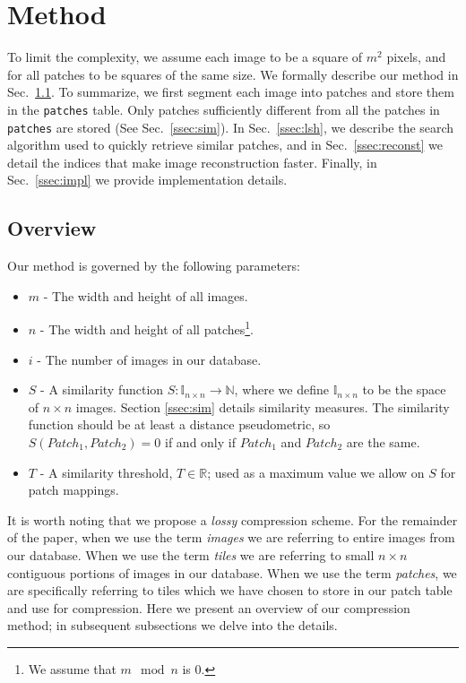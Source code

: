 \section{Method}\label{sec:method}

To limit the complexity, we assume
each image to be a square of $m^2$ pixels, and for all patches to
be squares of the same size.
We formally describe our method in Sec.~\ref{ssec:overview}. To summarize,
we first segment each image into patches and store them in the \texttt{patches} table.
Only patches sufficiently different
from all the patches in \texttt{patches} are stored (See Sec.~\ref{ssec:sim}).
In 
Sec.~\ref{ssec:lsh}, we describe the
search algorithm used to quickly retrieve similar patches, and in Sec.~\ref{ssec:reconst}
we detail the indices that make image reconstruction faster. Finally, in
Sec.~\ref{ssec:impl} we provide implementation details.

\subsection{Overview}\label{ssec:overview}

Our method is governed by the following parameters:
\begin{itemize}
\item $m$ - The width and height of all images.
\item $n$ - The width and height of all patches\footnote{We assume that $m \mod n$ is $0$.}.
\item $i$ - The number of images in our database.
\item $S$ - A similarity function $S \colon \mathds{I}_{n \times n}  \to \mathds{N}$, where we define $\mathds{I}_{n \times n}$ to be the space of $n \times n$ images.  Section \ref{ssec:sim} details similarity measures.  The similarity function should be at least a distance pseudometric, so $S(Patch_1, Patch_2) = 0$ if and only if $Patch_1$ and $Patch_2$ are the same.
\item $T$ - A similarity threshold, $T \in \mathds{R}$; used as a maximum value we allow on $S$ for patch mappings.

\end{itemize}

It is worth noting that we propose a \emph{lossy} compression scheme.  For the remainder of the paper, when we use the term \emph{images} we are referring to entire images from our database.  When we use the term \emph{tiles} we are referring to small $n \times n$ contiguous portions of images in our database.  When we use the term \emph{patches}, we are specifically referring to tiles which we have chosen to store in our patch table and use for compression.  Here we present an overview of our compression method; in subsequent subsections we delve into the details.  

